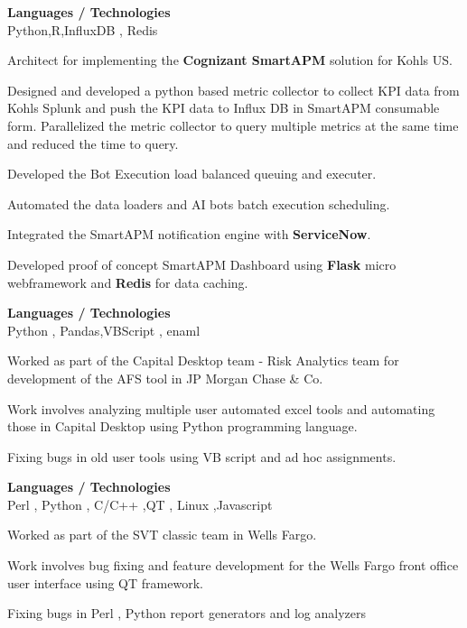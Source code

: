 \documentclass[a4,10pt]{cv4tw}
\begin{document}
{\textbf{Languages / Technologies} \\Python,R,InfluxDB , Redis}
	{
	\begin{missions}
		\item Architect for implementing the \textbf{Cognizant SmartAPM} solution for Kohls US.
		\item Designed and developed a python based metric collector to collect KPI data from Kohls Splunk and push the KPI data to Influx DB in SmartAPM consumable form. Parallelized the metric collector to query multiple metrics at the same time and reduced the time to query.
    \item Developed the Bot Execution load balanced queuing  and executer.
		\item Automated the data loaders and AI bots batch execution scheduling.
    \item Integrated the SmartAPM notification engine with \textbf{ServiceNow}.
    \item Developed proof of concept SmartAPM Dashboard using \textbf{Flask} micro webframework and  \textbf{Redis} for data caching.
	\end{missions}
}

{\textbf{Languages / Technologies} \\Python , Pandas,VBScript , enaml }
	{
	\begin{missions}
		\item Worked as part of the Capital Desktop team - Risk Analytics team for development of the AFS tool in JP Morgan Chase \& Co.
		\item Work involves analyzing multiple user automated excel tools and automating those in Capital Desktop using Python programming language.
		\item Fixing bugs in old user tools using VB script and ad hoc assignments.
	\end{missions}
}
{\textbf{Languages / Technologies} \\Perl , Python , C/C++ ,QT , Linux ,Javascript}
	{
	\begin{missions}
		\item Worked as part of the SVT classic team in Wells Fargo.
		\item Work involves bug fixing and feature development for the Wells Fargo front office user interface using QT framework.
		\item Fixing bugs in Perl , Python report generators and log analyzers
	\end{missions}
}
\end{document}
